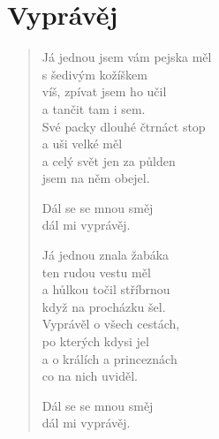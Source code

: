 \section*{Vyprávěj}

\begin{verse}
Já jednou jsem vám pejska měl \\
s šedivým kožíškem \\
víš, zpívat jsem ho učil \\
a tančit tam i sem.\\
Své packy dlouhé čtrnáct stop\\
a uši velké měl\\
a celý svět jen za půlden\\
jsem na něm obejel.

Dál se se mnou směj\\
dál mi vyprávěj.

Já jednou znala žabáka\\
ten rudou vestu měl\\
a hůlkou točil stříbrnou\\
když na procházku šel.\\
Vyprávěl o všech cestách,\\
po kterých kdysi jel\\
a o králích a princeznách\\
co na nich uviděl.

Dál se se mnou směj\\
dál mi vyprávěj.




\end{verse}
